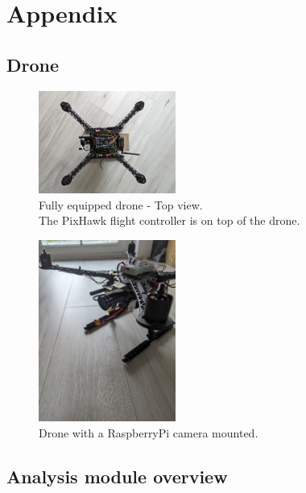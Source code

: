 \graphicspath{{./figures/}}
\chapter*{Appendix}
\renewcommand{\thesection}{\Alph{section}}

\section{Drone}
\label{sec:appendix_drone}
\begin{figure}[htbp]
    \centering
    \includegraphics[width=0.4\textwidth]{drone_fully_top.jpg}
    \caption[Fully equipped drone]{Fully equipped drone - Top view.\\
    The PixHawk flight controller is on top of the drone.}
\end{figure}

\begin{figure}[htbp]
    \centering
    \includegraphics[width=0.4\textwidth]{drone_cam.jpg}
    \caption[Drone with camera]{Drone with a RaspberryPi camera mounted.\\}
\end{figure}
\FloatBarrier
\newpage

\section{Analysis module overview}
\label{sec:appendix_ljanalizer}

